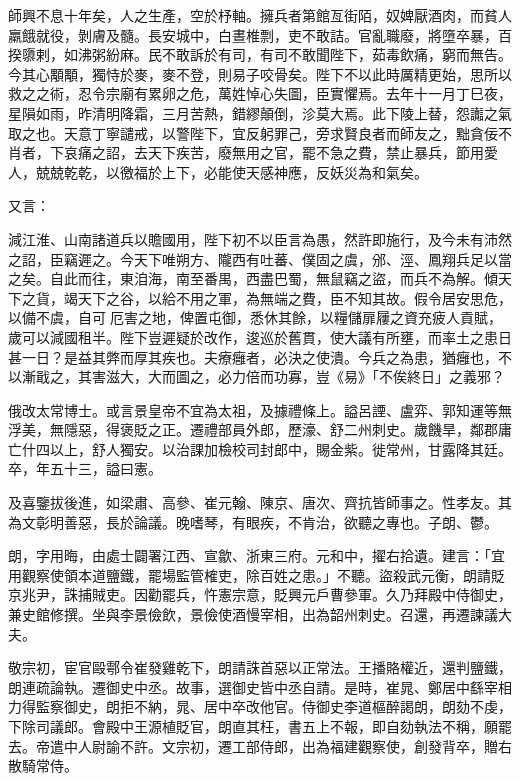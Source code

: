 \begin{pinyinscope}
 師興不息十年矣，人之生產，空於杼軸。擁兵者第館亙街陌，奴婢厭酒肉，而貧人羸餓就役，剝膚及髓。長安城中，白晝椎剽，吏不敢詰。官亂職廢，將墮卒暴，百揆隳剌，如沸粥紛麻。民不敢訴於有司，有司不敢聞陛下，茹毒飲痛，窮而無告。今其心顒顒，獨恃於麥，麥不登，則易子咬骨矣。陛下不以此時厲精更始，思所以救之之術，忍令宗廟有累卵之危，萬姓悼心失圖，臣實懼焉。去年十一月丁巳夜，星隕如雨，昨清明降霜，三月苦熱，錯繆顛倒，沴莫大焉。此下陵上替，怨讟之氣取之也。天意丁寧譴戒，以警陛下，宜反躬罪己，旁求賢良者而師友之，黜貪佞不肖者，下哀痛之詔，去天下疾苦，廢無用之官，罷不急之費，禁止暴兵，節用愛人，兢兢乾乾，以徼福於上下，必能使天感神應，反妖災為和氣矣。



 又言：



 減江淮、山南諸道兵以贍國用，陛下初不以臣言為愚，然許即施行，及今未有沛然之詔，臣竊遲之。今天下唯朔方、隴西有吐蕃、僕固之虞，邠、涇、鳳翔兵足以當之矣。自此而往，東洎海，南至番禺，西盡巴蜀，無鼠竊之盜，而兵不為解。傾天下之貨，竭天下之谷，以給不用之軍，為無端之費，臣不知其故。假令居安思危，以備不虞，自可厄害之地，俾置屯御，悉休其餘，以糧儲扉屨之資充疲人貢賦，歲可以減國租半。陛下豈遲疑於改作，逡巡於舊貫，使大議有所壅，而率土之患日甚一日？是益其弊而厚其疾也。夫療癰者，必決之使潰。今兵之為患，猶癰也，不以漸戢之，其害滋大，大而圖之，必力倍而功寡，豈《易》「不俟終日」之義邪？



 俄改太常博士。或言景皇帝不宜為太祖，及據禮條上。謚呂諲、盧弈、郭知運等無浮美，無隱惡，得褒貶之正。遷禮部員外郎，歷濠、舒二州刺史。歲饑旱，鄰郡庸亡什四以上，舒人獨安。以治課加檢校司封郎中，賜金紫。徙常州，甘露降其廷。卒，年五十三，謚曰憲。



 及喜鑒拔後進，如梁肅、高參、崔元翰、陳京、唐次、齊抗皆師事之。性孝友。其為文彰明善惡，長於論議。晚嗜琴，有眼疾，不肯治，欲聽之專也。子朗、鬱。



 朗，字用晦，由處士闢署江西、宣歙、浙東三府。元和中，擢右拾遺。建言：「宜用觀察使領本道鹽鐵，罷場監管榷吏，除百姓之患。」不聽。盜殺武元衡，朗請貶京兆尹，誅捕賊吏。因勸罷兵，忤憲宗意，貶興元戶曹參軍。久乃拜殿中侍御史，兼史館修撰。坐與李景儉飲，景儉使酒慢宰相，出為韶州刺史。召還，再遷諫議大夫。



 敬宗初，宦官毆鄠令崔發雞乾下，朗請誅首惡以正常法。王播賂權近，還判鹽鐵，朗連疏論執。遷御史中丞。故事，選御史皆中丞自請。是時，崔晁、鄭居中繇宰相力得監察御史，朗拒不納，晁、居中卒改他官。侍御史李道樞醉謁朗，朗劾不虔，下除司議郎。會殿中王源植貶官，朗直其枉，書五上不報，即自劾執法不稱，願罷去。帝遣中人尉諭不許。文宗初，遷工部侍郎，出為福建觀察使，創發背卒，贈右散騎常侍。




\end{pinyinscope}
